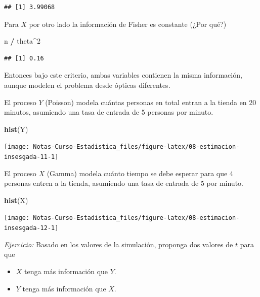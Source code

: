 \documentclass[
  12pt,
]{book}
\newenvironment{Shaded}{\begin{snugshade}}{\end{snugshade}}
\newcommand{\DecValTok}[1]{\textcolor[rgb]{0.00,0.00,0.81}{#1}}
\newcommand{\KeywordTok}[1]{\textcolor[rgb]{0.13,0.29,0.53}{\textbf{#1}}}
\newcommand{\NormalTok}[1]{#1}
\newcommand{\OperatorTok}[1]{\textcolor[rgb]{0.81,0.36,0.00}{\textbf{#1}}}
\newcommand{\StringTok}[1]{\textcolor[rgb]{0.31,0.60,0.02}{#1}}
\providecommand{\tightlist}{%
  \setlength{\itemsep}{0pt}\setlength{\parskip}{0pt}}
\begin{document}
\begin{verbatim}
## [1] 3.99068
\end{verbatim}

Para \(X\) por otro lado la información de Fisher es constante (¿Por qué?)

\begin{Shaded}
\begin{Highlighting}[]
\NormalTok{n }\OperatorTok{/}\StringTok{ }\NormalTok{theta}\OperatorTok{\^{}}\DecValTok{2}
\end{Highlighting}
\end{Shaded}

\begin{verbatim}
## [1] 0.16
\end{verbatim}

Entonces bajo este criterio, ambas variables contienen la misma información,
aunque modelen el problema desde ópticas diferentes.

El proceso \(Y\) (Poisson) modela cuántas personas en total entran a la tienda en 20 minutos, asumiendo una tasa de entrada de 5 personas por minuto.

\begin{Shaded}
\begin{Highlighting}[]
\KeywordTok{hist}\NormalTok{(Y)}
\end{Highlighting}
\end{Shaded}

\begin{center}\texttt{[image: Notas-Curso-Estadistica\_files/figure-latex/08-estimacion-insesgada-11-1]} \end{center}

El proceso \(X\) (Gamma) modela cuánto tiempo se debe esperar para que 4 personas entren a la tienda, asumiendo una tasa de entrada de 5 por minuto.

\begin{Shaded}
\begin{Highlighting}[]
\KeywordTok{hist}\NormalTok{(X)}
\end{Highlighting}
\end{Shaded}

\begin{center}\texttt{[image: Notas-Curso-Estadistica\_files/figure-latex/08-estimacion-insesgada-12-1]} \end{center}

\emph{Ejercicio:} Basado en los valores de la simulación, proponga dos valores de \(t\) para que

\begin{itemize}
\tightlist
\item
  \(X\) tenga más información que \(Y\).
\item
  \(Y\) tenga más información que \(X\).
\end{itemize}
\end{document}
